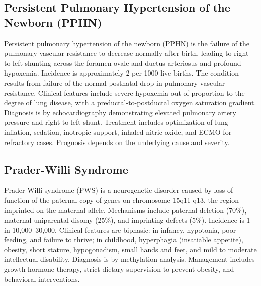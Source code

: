 \subsection{Persistent Pulmonary Hypertension of the Newborn (PPHN)}
\label{sec:Persistent Pulmonary Hypertension of the Newborn}
Persistent pulmonary hypertension of the newborn (PPHN) is the failure of the pulmonary vascular resistance to decrease normally after birth, leading to right-to-left shunting across the foramen ovale and ductus arteriosus and profound hypoxemia. Incidence is approximately 2 per 1000 live births. The condition results from failure of the normal postnatal drop in pulmonary vascular resistance. Clinical features include severe hypoxemia out of proportion to the degree of lung disease, with a preductal-to-postductal oxygen saturation gradient. Diagnosis is by echocardiography demonstrating elevated pulmonary artery pressure and right-to-left shunt. Treatment includes optimization of lung inflation, sedation, inotropic support, inhaled nitric oxide, and ECMO for refractory cases. Prognosis depends on the underlying cause and severity.

\subsection{Prader-Willi Syndrome}
\label{sec:Prader-Willi Syndrome}
Prader-Willi syndrome (PWS) is a neurogenetic disorder caused by loss of function of the paternal copy of genes on chromosome 15q11-q13, the region imprinted on the maternal allele. Mechanisms include paternal deletion (70\%), maternal uniparental disomy (25\%), and imprinting defects (5\%). Incidence is 1 in 10,000--30,000. Clinical features are biphasic: in infancy, hypotonia, poor feeding, and failure to thrive; in childhood, hyperphagia (insatiable appetite), obesity, short stature, hypogonadism, small hands and feet, and mild to moderate intellectual disability. Diagnosis is by methylation analysis. Management includes growth hormone therapy, strict dietary supervision to prevent obesity, and behavioral interventions.


